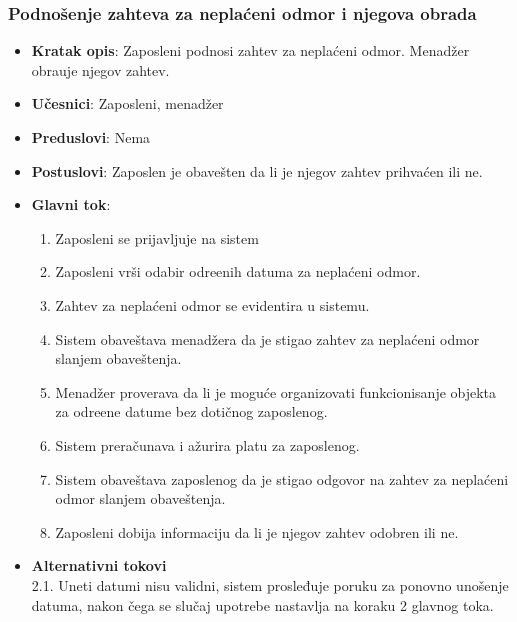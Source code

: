 \newpage
 \subsubsection{Podno\v senje zahteva za nepla\'ceni odmor i njegova obrada }
 
 
 \begin{itemize}
    \item \textbf{Kratak opis}:
  Zaposleni podnosi zahtev za nepla\'ceni odmor. Menad\v zer obra\dj uje njegov zahtev.
    \item \textbf{Učesnici}:
    Zaposleni, menad\v zer
    \item \textbf{Preduslovi}: Nema
    \item \textbf{Postuslovi}:
    Zaposlen je obave\v sten da li je njegov zahtev prihva\'cen ili ne.
    \item \textbf{Glavni tok}:
    \begin{enumerate}
        \item Zaposleni se prijavljuje na sistem
        \item Zaposleni vr\v si odabir odre\dj enih datuma za nepla\'ceni odmor.
        \item Zahtev za nepla\'ceni odmor se evidentira u sistemu.
        \item Sistem obave\v stava menad\v zera da je stigao zahtev za nepla\'ceni odmor slanjem obaveštenja.
        \item Menad\v zer proverava da li je moguće organizovati funkcionisanje objekta za odre\dj ene datume bez dotičnog zaposlenog.
        \item Sistem prera\v cunava i a\v zurira platu za zaposlenog.
        \item Sistem obave\v stava zaposlenog da je stigao odgovor na zahtev za nepla\'ceni odmor slanjem obaveštenja.
        \item Zaposleni dobija informaciju da li je njegov zahtev odobren ili ne.
    \end{enumerate}
\item \textbf{Alternativni tokovi}\\
        2.1. Uneti datumi nisu validni, sistem prosleđuje poruku za ponovno unošenje datuma, nakon čega se slučaj upotrebe nastavlja na koraku 2 glavnog toka.

\end{itemize}

